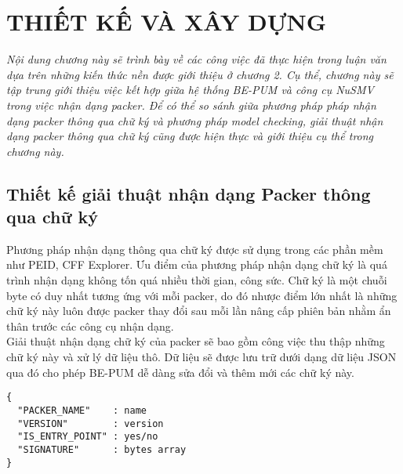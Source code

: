 
\newpage
\chapter{THIẾT KẾ VÀ XÂY DỰNG}

\begin{concept}[15cm]
\textit{Nội dung chương này sẽ trình bày về các công việc đã thực hiện trong luận văn dựa trên những kiến thức nền được giới thiệu ở chương 2. Cụ thể, chương này sẽ tập trung giới thiệu việc kết hợp giữa hệ thống BE-PUM và công cụ NuSMV trong việc nhận dạng packer. Để có thể so sánh giữa phương pháp pháp nhận dạng packer thông qua chữ ký và phương pháp model checking, giải thuật nhận dạng packer thông qua chữ ký cũng được hiện thực và giới thiệu cụ thể trong chương này.}
\end{concept}

\section{Thiết kế giải thuật nhận dạng Packer thông qua chữ ký}

\hspace{0.5cm}Phương pháp nhận dạng thông qua chữ ký được sử dụng trong các phần mềm như PEID, CFF Explorer. Ưu điểm của phương pháp nhận dạng chữ ký là quá trình nhận dạng không tốn quá nhiều thời gian, công sức. Chữ ký là một chuỗi byte có duy nhất tương ứng với mỗi packer, do đó nhược điểm lớn nhất là những chữ ký này luôn được packer thay đổi sau mỗi lần nâng cấp phiên bản nhằm ẩn thân trước các công cụ nhận dạng.\\

\hspace{0.5cm}Giải thuật nhận dạng chữ ký của packer sẽ bao gồm công việc thu thập những chữ ký này và xử lý dữ liệu thô. Dữ liệu sẽ được lưu trữ dưới dạng dữ liệu JSON qua đó cho phép BE-PUM dễ dàng sửa đổi và thêm mới các chữ ký này.

\begin{code}
\begin{lstlisting}[captionpos=b,caption={Cấu trúc lưu trữ của một chữ ký},frame=single]
{
  "PACKER_NAME"    : name
  "VERSION"        : version
  "IS_ENTRY_POINT" : yes/no
  "SIGNATURE"      : bytes array
}
\end{lstlisting}
\end{code}

